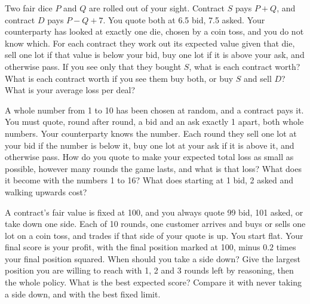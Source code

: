 \begin{question}\label{iq:iv2:making-a-market:31}
Two fair dice $P$ and $Q$ are rolled out of your sight. Contract $S$ pays $P + Q$, and contract $D$ pays $P - Q + 7$. You quote both at 6.5 bid, 7.5 asked. Your counterparty has looked at exactly one die, chosen by a coin toss, and you do not know which. For each contract they work out its expected value given that die, sell one lot if that value is below your bid, buy one lot if it is above your ask, and otherwise pass. If you see only that they bought $S$, what is each contract worth? What is each contract worth if you see them buy both, or buy $S$ and sell $D$? What is your average loss per deal?
\end{question}

\begin{question}\label{iq:iv2:making-a-market:32}
A whole number from 1 to 10 has been chosen at random, and a contract pays it. You must quote, round after round, a bid and an ask exactly 1 apart, both whole numbers. Your counterparty knows the number. Each round they sell one lot at your bid if the number is below it, buy one lot at your ask if it is above it, and otherwise pass. How do you quote to make your expected total loss as small as possible, however many rounds the game lasts, and what is that loss? What does it become with the numbers 1 to 16? What does starting at 1 bid, 2 asked and walking upwards cost?
\end{question}

\begin{question}\label{iq:iv2:making-a-market:33}
A contract's fair value is fixed at 100, and you always quote 99 bid, 101 asked, or take down one side. Each of 10 rounds, one customer arrives and buys or sells one lot on a coin toss, and trades if that side of your quote is up. You start flat. Your final score is your profit, with the final position marked at 100, minus $0.2$ times your final position squared. When should you take a side down? Give the largest position you are willing to reach with 1, 2 and 3 rounds left by reasoning, then the whole policy. What is the best expected score? Compare it with never taking a side down, and with the best fixed limit.
\end{question}

